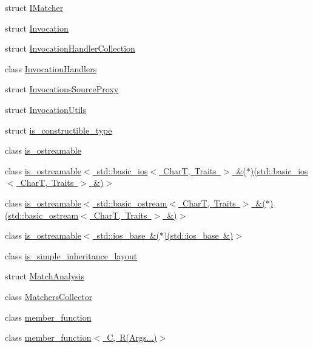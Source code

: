 \begin{DoxyCompactItemize}
\item 
struct \mbox{\hyperlink{structfakeit_1_1IMatcher}{I\+Matcher}}
\item 
struct \mbox{\hyperlink{structfakeit_1_1Invocation}{Invocation}}
\item 
struct \mbox{\hyperlink{structfakeit_1_1InvocationHandlerCollection}{Invocation\+Handler\+Collection}}
\item 
class \mbox{\hyperlink{classfakeit_1_1InvocationHandlers}{Invocation\+Handlers}}
\item 
struct \mbox{\hyperlink{structfakeit_1_1InvocationsSourceProxy}{Invocations\+Source\+Proxy}}
\item 
struct \mbox{\hyperlink{structfakeit_1_1InvocationUtils}{Invocation\+Utils}}
\item 
struct \mbox{\hyperlink{structfakeit_1_1is__constructible__type}{is\+\_\+constructible\+\_\+type}}
\item 
class \mbox{\hyperlink{classfakeit_1_1is__ostreamable}{is\+\_\+ostreamable}}
\item 
class \mbox{\hyperlink{classfakeit_1_1is__ostreamable_3_01std_1_1basic__ios_3_01CharT_00_01Traits_01_4_01_6_07_5_08_07s858900d5afa7b057943113e46fead66f}{is\+\_\+ostreamable$<$ std\+::basic\+\_\+ios$<$ Char\+T, Traits $>$ \&($\ast$)(std\+::basic\+\_\+ios$<$ Char\+T, Traits $>$ \&)$>$}}
\item 
class \mbox{\hyperlink{classfakeit_1_1is__ostreamable_3_01std_1_1basic__ostream_3_01CharT_00_01Traits_01_4_01_6_07_5_086149b49f9e11bccc7fe4ea6fedd21c71}{is\+\_\+ostreamable$<$ std\+::basic\+\_\+ostream$<$ Char\+T, Traits $>$ \&($\ast$)(std\+::basic\+\_\+ostream$<$ Char\+T, Traits $>$ \&)$>$}}
\item 
class \mbox{\hyperlink{classfakeit_1_1is__ostreamable_3_01std_1_1ios__base_01_6_07_5_08_07std_1_1ios__base_01_6_08_4}{is\+\_\+ostreamable$<$ std\+::ios\+\_\+base \&($\ast$)(std\+::ios\+\_\+base \&)$>$}}
\item 
class \mbox{\hyperlink{classfakeit_1_1is__simple__inheritance__layout}{is\+\_\+simple\+\_\+inheritance\+\_\+layout}}
\item 
struct \mbox{\hyperlink{structfakeit_1_1MatchAnalysis}{Match\+Analysis}}
\item 
class \mbox{\hyperlink{classfakeit_1_1MatchersCollector}{Matchers\+Collector}}
\item 
class \mbox{\hyperlink{classfakeit_1_1member__function}{member\+\_\+function}}
\item 
class \mbox{\hyperlink{classfakeit_1_1member__function_3_01C_00_01R_07Args_8_8_8_08_4}{member\+\_\+function$<$ C, R(\+Args...)$>$}}

\end{DoxyCompactItemize}
